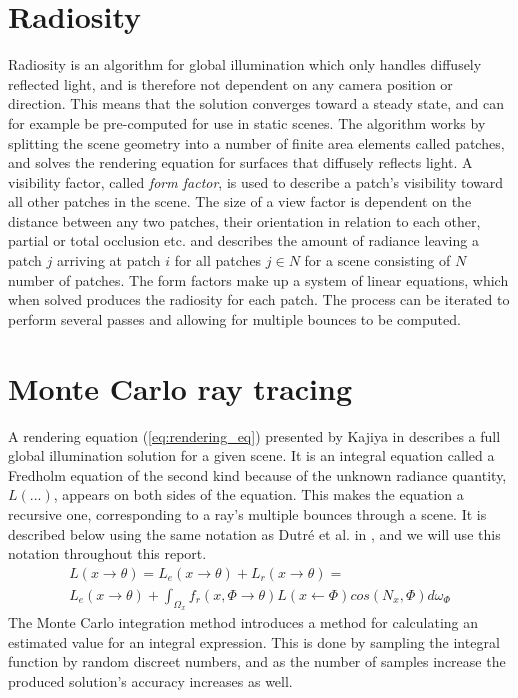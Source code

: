 \documentclass[a4paper, 12pt]{report}
\begin{document}
\section{Radiosity}
Radiosity is an algorithm for global illumination which only handles diffusely reflected light, and is therefore not dependent on any camera position or direction. This means that the solution converges toward a steady state, and can for example be pre-computed for use in static scenes. The algorithm works by splitting the scene geometry into a number of finite area elements called patches, and solves the rendering equation for surfaces that diffusely reflects light. A visibility factor, called \emph{form factor}, is used to describe a patch's visibility toward all other patches in the scene. The size of a view factor is dependent on the distance between any two patches, their orientation in relation to each other, partial or total occlusion etc. and describes the amount of radiance leaving a patch $j$ arriving at patch $i$ for all patches $j \in N$ for a scene consisting of $N$ number of patches. The form factors make up a system of linear equations, which when solved produces the radiosity for each patch. The process can be iterated to perform several passes and allowing for multiple bounces to be computed.

\section{Monte Carlo ray tracing}
A rendering equation (\ref{eq:rendering_eq}) presented by Kajiya in \cite{kajiya} describes a full global illumination solution for a given scene. It is an integral equation called a Fredholm equation of the second kind because of the unknown radiance quantity, $L(...)$, appears on both sides of the equation. This makes the equation a recursive one, corresponding to a ray's multiple bounces through a scene. It is described below using the same notation as Dutr\'{e} et al. in \cite{dutre}, and we will use this notation throughout this report.
\begin{equation}
\label{eq:rendering_eq}
\begin{split}
L(x \rightarrow \theta) = L_e(x \rightarrow \theta) + L_r(x \rightarrow \theta) =\\ 
L_e(x \rightarrow \theta) + \int_{\Omega_x} f_r(x, \Phi \rightarrow \theta)L(x \leftarrow \Phi)cos(N_x, \Phi)d\omega_{\Phi}
\end{split}
\end{equation}
The Monte Carlo integration method introduces a method for calculating an estimated value for an integral expression. This is done by sampling the integral function by random discreet numbers, and as the number of samples increase the produced solution's accuracy increases as well.
\end{document}
